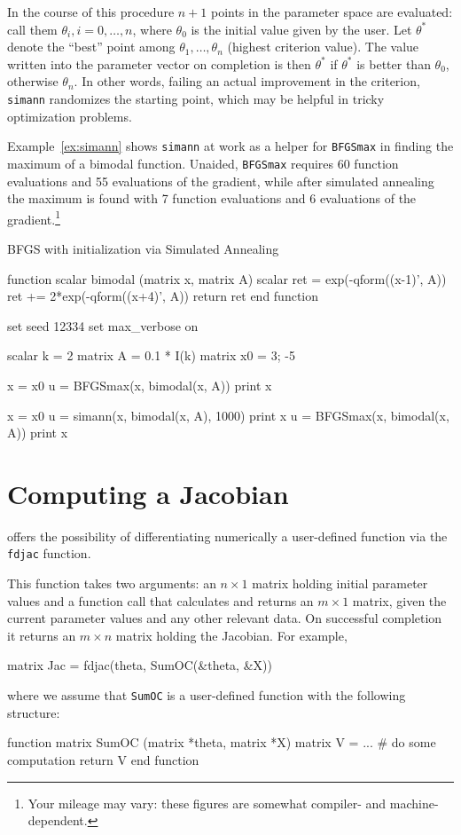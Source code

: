In the course of this procedure $n+1$ points in the parameter space
are evaluated: call them $\theta_i, i=0,\dots,n$, where $\theta_0$ is
the initial value given by the user. Let $\theta^*$ denote the
``best'' point among $\theta_1, \dots, \theta_n$ (highest criterion
value). The value written into the parameter vector on completion is
then $\theta^*$ if $\theta^*$ is better than $\theta_0$, otherwise
$\theta_n$. In other words, failing an actual improvement in the
criterion, \texttt{simann} randomizes the starting point, which may be
helpful in tricky optimization problems.

Example~\ref{ex:simann} shows \texttt{simann} at work as a helper for
\texttt{BFGSmax} in finding the maximum of a bimodal function.
Unaided, \texttt{BFGSmax} requires 60 function evaluations and
55 evaluations of the gradient, while after simulated annealing
the maximum is found with 7 function evaluations and 6 evaluations
of the gradient.\footnote{Your mileage may vary: these figures
are somewhat compiler- and machine-dependent.}

\begin{script}[htbp]
  \caption{BFGS with initialization via Simulated Annealing}
  \label{ex:simann}
\begin{scode}
function scalar bimodal (matrix x, matrix A)
    scalar ret = exp(-qform((x-1)', A))
    ret += 2*exp(-qform((x+4)', A))
    return ret
end function

set seed 12334
set max_verbose on

scalar k = 2
matrix A = 0.1 * I(k)
matrix x0 = {3; -5}

x = x0
u = BFGSmax(x, bimodal(x, A))
print x

x = x0
u = simann(x, bimodal(x, A), 1000)
print x
u = BFGSmax(x, bimodal(x, A))
print x
\end{scode}
\end{script}

\section{Computing a Jacobian}
\label{sec:fdjac}

 offers the possibility of differentiating numerically a
user-defined function via the \texttt{fdjac} function. 

This function takes two arguments: an $n \times 1$ matrix holding
initial parameter values and a function call that calculates and
returns an $m \times 1$ matrix, given the current parameter values and
any other relevant data.  On successful completion it returns an $m
\times n$ matrix holding the Jacobian.  For example,
%
\begin{code}
matrix Jac = fdjac(theta, SumOC(&theta, &X))
\end{code}
where we assume that \texttt{SumOC} is a user-defined function with
the following structure:
%
\begin{code}
function matrix SumOC (matrix *theta, matrix *X)
  matrix V = ...  # do some computation
  return V
end function
\end{code}

